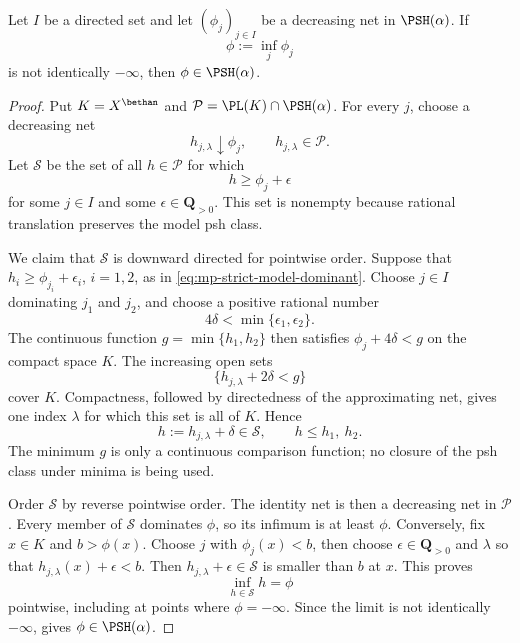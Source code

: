 \begin{proposition}
\label{prop:mp-psh-decreasing-stability}
Let $I$ be a directed set and let $(\phi_j)_{j\in I}$ be a
decreasing net in $\PSH(\alpha)$.  If
\[
                         \phi:=\inf_j\phi_j
\]
is not identically $-\infty$, then $\phi\in\PSH(\alpha)$.
\end{proposition}

\begin{proof}
Put $K=X^{\bethan}$ and
$\mathcal P=\PL(K)\cap\PSH(\alpha)$.  For every $j$, choose a
decreasing net
\[
                    h_{j,\lambda}\downarrow\phi_j,
                    \qquad h_{j,\lambda}\in\mathcal P.
\]
Let $\mathcal S$ be the set of all $h\in\mathcal P$ for which
\[
                  h\geq\phi_j+\epsilon
\tag{60.16a}\label{eq:mp-strict-model-dominant}
\]
for some $j\in I$ and some $\epsilon\in\mathbf Q_{>0}$.  This set is
nonempty because rational translation preserves the model psh class.

We claim that $\mathcal S$ is downward directed for pointwise order.
Suppose that $h_i\geq\phi_{j_i}+\epsilon_i$, $i=1,2$, as in
\eqref{eq:mp-strict-model-dominant}.  Choose
$j\in I$ dominating $j_1$ and $j_2$, and choose a positive rational number
\[
                  4\delta<\min\{\epsilon_1,\epsilon_2\}.
\]
The continuous function $g=\min\{h_1,h_2\}$ then satisfies
$\phi_j+4\delta<g$ on the compact space $K$.  The increasing open
sets
\[
                  \{h_{j,\lambda}+2\delta<g\}
\]
cover $K$.  Compactness, followed by directedness of the approximating
net, gives one index $\lambda$ for which this set is all of $K$.
Hence
\[
                  h:=h_{j,\lambda}+\delta\in\mathcal S,
                  \qquad h\leq h_1,\ h_2.
\]
The minimum $g$ is only a continuous comparison function; no closure of
the psh class under minima is being used.

Order $\mathcal S$ by reverse pointwise order.  The identity net is then
a decreasing net in $\mathcal P$.  Every member of $\mathcal S$
dominates $\phi$, so its infimum is at least $\phi$.  Conversely, fix
$x\in K$ and $b>\phi(x)$.  Choose $j$ with $\phi_j(x)<b$, then
choose $\epsilon\in\mathbf Q_{>0}$ and $\lambda$ so that
$h_{j,\lambda}(x)+\epsilon<b$.  Then
$h_{j,\lambda}+\epsilon\in\mathcal S$ is smaller than $b$ at
$x$.  This proves
\[
                         \inf_{h\in\mathcal S}h=\phi
\]
pointwise, including at points where $\phi=-\infty$.  Since the limit is
not identically $-\infty$,  gives
$\phi\in\PSH(\alpha)$.
\end{proof}

